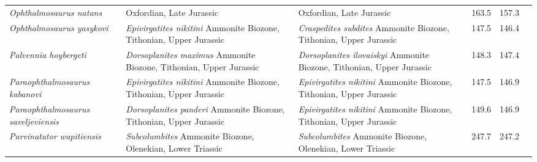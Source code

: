 \begin{longtabu}{>{\itshape}lXXSSl}
	Ophthalmosaurus natans                               & Oxfordian, Late Jurassic                                                                                                           & Oxfordian, Late Jurassic                                                                                                           & 163.5                    & 157.3                    & \cite{Gilmore1905} \\                    
	Ophthalmosaurus yasykovi                             & \emph{Epivirgatites nikitini} Ammonite Biozone, Tithonian, Upper Jurassic                                                          & \emph{Craspedites subdites} Ammonite Biozone, Tithonian, Upper Jurassic                                                            & 147.5                    & 146.4                    & \cite{Efimov1999} \\                     
	Palvennia hoybergeti                                 & \emph{Dorsoplanites maximus} Ammonite Biozone, Tithonian, Upper Jurassic                                                           & \emph{Dorsoplanites ilovaiskyi} Ammonite Biozone, Tithonian, Upper Jurassic                                                        & 148.3                    & 147.4                    & \cite{Druckenmiller2012a} \\             
	Paraophthalmosaurus kabanovi                         & \emph{Epivirgatites nikitini} Ammonite Biozone, Tithonian, Upper Jurassic                                                          & \emph{Epivirgatites nikitini} Ammonite Biozone, Tithonian, Upper Jurassic                                                          & 147.5                    & 146.9                    & \cite{Efimov1999a} \\                    
	Paraophthalmosaurus saveljeviensis                   & \emph{Dorsoplanites panderi} Ammonite Biozone, Tithonian, Upper Jurassic                                                           & \emph{Epivirgatites nikitini} Ammonite Biozone, Tithonian, Upper Jurassic                                                          & 149.6                    & 146.9                    & \cite{Arkhangelsky1997} \\               
	Parvinatator wapitiensis                             & \emph{Subcolumbites} Ammonite Biozone, Olenekian, Lower Triassic                                                                   & \emph{Subcolumbites} Ammonite Biozone, Olenekian, Lower Triassic                                                                   & 247.7                    & 247.2                    & \cite{Nicholls1995} \\                   

\end{longtabu}
